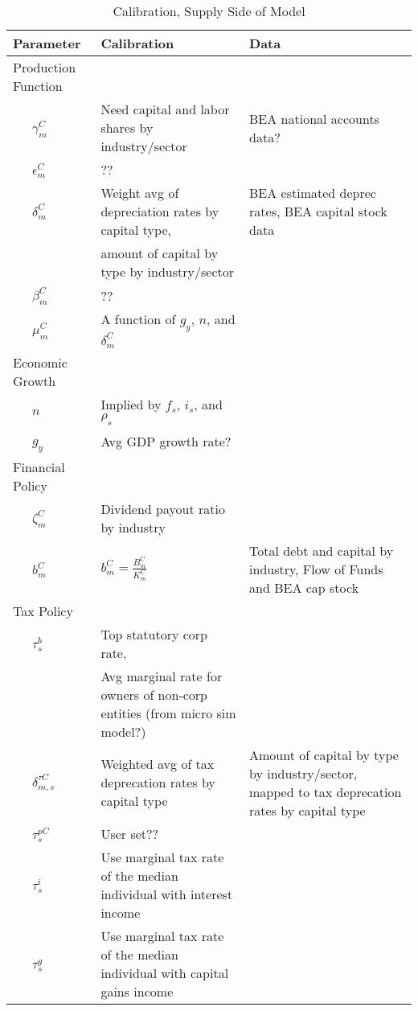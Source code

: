 \documentclass[article,11pt,letterpaper,fleqn]{article}
\theoremstyle{definition}
\numberwithin{equation}{section}
\begin{document}
\begin{landscape}
\begin{table}[htbp]
  \centering
  \caption{Calibration, Supply Side of Model}
    \begin{tabular}{lll}
    \hline
    \hline
    Parameter & Calibration & Data \\
    \hline
    Production Function &       &  \\
    \ \ \ $\gamma^{C}_{m}$ & Need capital and labor shares by industry/sector & BEA national accounts data? \\
    \ \ \ $\epsilon^{C}_{m}$ & ??    &  \\
    \ \ \ $\delta^{C}_{m}$ & Weight avg of depreciation rates by capital type,  & BEA estimated deprec rates, BEA capital stock data \\
    & amount of capital by type by industry/sector & \\
    \ \ \ $\beta^{C}_{m}$ & ??    &  \\
    \ \ \ $\mu^{C}_{m}$ & A function of $g_{y}$, $n$, and $\delta^{C}_{m}$ &  \\
    Economic Growth &       &  \\
    \ \ \ $n$ & Implied by $f_{s}$, $i_{s}$, and $\rho_{s}$ &  \\
    \ \ \ $g_{y}$ & Avg GDP growth rate? &  \\
    Financial Policy &       &  \\
    \ \ \ $\zeta^{C}_{m}$ & Dividend payout ratio by industry &  \\
    \ \ \ $b^{C}_{m}$ & $b^{C}_{m}=\frac{B^{C}_{m}}{K^{C}_{m}}$ & Total debt and capital by industry, Flow of Funds and BEA cap stock \\
    Tax Policy &       &  \\
    \ \ \ $\tau^{b}_{s}$ & Top statutory corp rate,  &  \\
    & Avg marginal rate for owners of non-corp entities (from micro sim model?)& \\
    \ \ \ $\delta^{\tau C}_{m,s}$ & Weighted avg of tax deprecation rates by capital type & Amount of capital by type by industry/sector, mapped to tax deprecation rates by capital type \\
    \ \ \ $\tau^{pC}_{s}$ & User set?? &  \\
    \ \ \ $\tau^{i}_{s}$ & Use marginal tax rate of the median individual with interest income &  \\
    \ \ \ $\tau^{g}_{s}$ & Use marginal tax rate of the median individual with capital gains income &  \\

\end{tabular}
\end{table}
\end{landscape}
\end{document}
